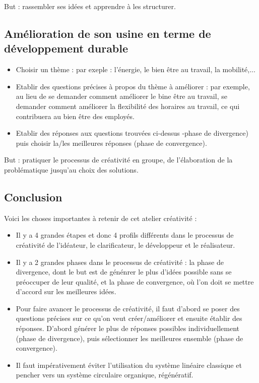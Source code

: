 But : rassembler ses idées et apprendre à les structurer.

\subsection{Amélioration de son usine en terme de développement durable}

\begin{itemize}
	\item Choisir un thème : par exeple : l'énergie, le bien être au travail, la mobilité,...
	\item Etablir des questions précises à propos du thème à améliorer : par exemple, au lieu de se
	demander comment améliorer le bine être au travail, se demander comment améliorer la flexibilité
	des horaires au travail, ce qui contribuera au bien être des employés.
	\item Etablir des réponses aux questions trouvées ci-dessus -phase de divergence) puis choisir
	la/les meilleures réponses (phase de convergence).
\end{itemize}

But : pratiquer le processus de créativité en groupe, de l'élaboration de la problématique jusqu'au choix des solutions.

\subsection{Conclusion}
Voici les choses importantes à retenir de cet atelier créativité :

\begin{itemize}
	\item Il y a 4 grandes étapes et donc 4 profils différents dans le processus de créativité de l'idéateur,
	le clarificateur, le développeur et le réalisateur.
	\item Il y a 2 grandes phases dans le processus de créativité : la phase de divergence,
	dont le but est de génénrer le plus d'idées possible sans se préoccuper de leur qualité,
	et la phase de convergence, où l'on doit se mettre d'accord sur les meilleures idées.
	\item Pour faire avancer le processus de créativité, il faut d'abord se poser des questions
	précises sur ce qu'on veut créer/améliorer et ensuite établir des réponses. D'abord générer
	le plus de réponses possibles individuellement (phase de divergence), puis sélectionner
	les meilleures ensemble (phase de convergence).
	\item Il faut impérativement éviter l'utilisation du système linéaire classique et pencher
	vers un système circulaire organique, régénératif.
\end{itemize}


